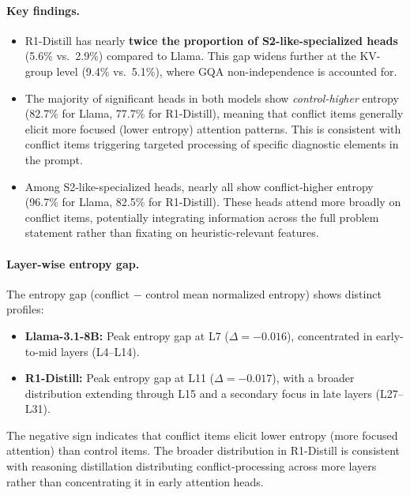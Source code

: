 \documentclass{article}
\newcommand{\stwo}{S2-like}
\begin{document}
\paragraph{Key findings.}
\begin{itemize}[leftmargin=*,itemsep=2pt]
  \item R1-Distill has nearly \textbf{twice the proportion of
  \stwo{}-specialized heads} (5.6\% vs.\ 2.9\%) compared to Llama.
  This gap widens further at the KV-group level (9.4\% vs.\ 5.1\%),
  where GQA non-independence is accounted for.

  \item The majority of significant heads in both models show
  \emph{control-higher} entropy (82.7\% for Llama, 77.7\% for
  R1-Distill), meaning that conflict items generally elicit more
  focused (lower entropy) attention patterns.  This is consistent
  with conflict items triggering targeted processing of specific
  diagnostic elements in the prompt.

  \item Among \stwo{}-specialized heads, nearly all show
  conflict-higher entropy (96.7\% for Llama, 82.5\% for R1-Distill).
  These heads attend more broadly on conflict items, potentially
  integrating information across the full problem statement rather
  than fixating on heuristic-relevant features.
\end{itemize}

\paragraph{Layer-wise entropy gap.}
The entropy gap (conflict $-$ control mean normalized entropy)
shows distinct profiles:
\begin{itemize}[leftmargin=*,itemsep=2pt]
  \item \textbf{Llama-3.1-8B:} Peak entropy gap at L7
  ($\Delta = -0.016$), concentrated in early-to-mid layers
  (L4--L14).
  \item \textbf{R1-Distill:} Peak entropy gap at L11
  ($\Delta = -0.017$), with a broader distribution extending
  through L15 and a secondary focus in late layers (L27--L31).
\end{itemize}

\noindent The negative sign indicates that conflict items elicit
lower entropy (more focused attention) than control items.  The
broader distribution in R1-Distill is consistent with reasoning
distillation distributing conflict-processing across more layers
rather than concentrating it in early attention heads.
\end{document}
